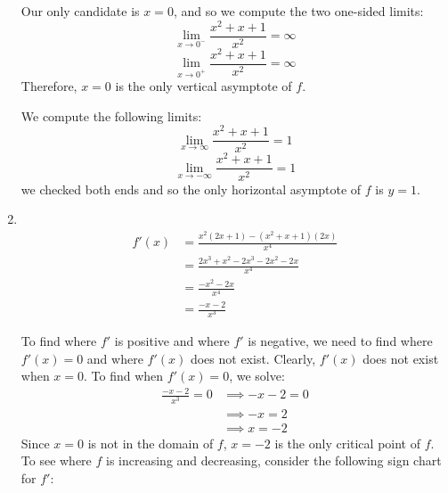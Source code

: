 \documentclass[nooutcomes,handout]{ximera}
\begin{document}
\begin{problem}
\begin{freeResponse}
\begin{enumerate}
         Our only candidate is $x=0$, and so we compute the two one-sided limits:
       \[
         \lim_{x \to 0^-} \frac{x^2+x+1}{x^2} = \infty 
       \]
       \[
         \lim_{x \to 0^+} \frac{x^2+x+1}{x^2} = \infty
       \]
       Therefore, $x=0$ is the only vertical asymptote of $f$.

         We compute the following limits:
       \[
         \lim_{x \to \infty} \frac{x^2+x+1}{x^2} = 1
       \]
       \[
         \lim_{x \to -\infty} \frac{x^2+x+1}{x^2} = 1
       \]
       we checked both ends and so the only horizontal asymptote of $f$ is $y=1$.
			

			
     \item
         \\

       \begin{align*}
         f'(x) &= \frac{x^2(2x+1) - (x^2+x+1)(2x)}{x^4} \\
               &= \frac{2x^3 + x^2 - 2x^3 - 2x^2 - 2x}{x^4} \\
               &= \frac{-x^2 - 2x}{x^4} \\
               &= \frac{-x-2}{x^3}
       \end{align*}
			
       To find where $f'$ is positive and where $f'$ is negative, we need to find where $f'(x) = 0$ and where $f'(x)$ does not exist.
       Clearly, $f'(x)$ does not exist when $x=0$.
       To find when $f'(x) = 0$, we solve:
       \begin{align*}
         \frac{-x-2}{x^3} = 0 &\implies -x-2 = 0 \\
         &\implies -x = 2\\
         &\implies x = -2
       \end{align*}
       Since $x=0$ is not in the domain of $f$, $x=-2$ is the only critical point of $f$.
       To see where $f$ is increasing and decreasing, consider the following sign chart for $f'$:
       \begin{center}
         \begin{image}
         \end{image}
       \end{center}


\end{enumerate}
\end{freeResponse}
\end{problem}
\end{document}
